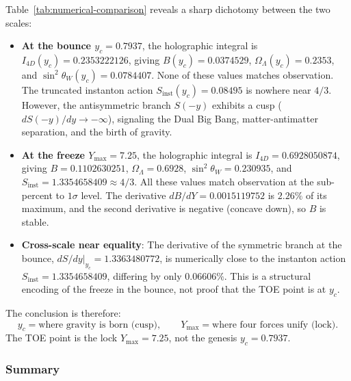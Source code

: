 \documentclass[a4paper,1pt,oneside,openany]{book}
\begin{document}
Table~\ref{tab:numerical-comparison} reveals a sharp dichotomy between the two scales:

\begin{itemize}
\item \textbf{At the bounce $y_c = 0.7937$}, the holographic integral is $I_{4D}(y_c) = 0.2353222126$, giving $B(y_c) = 0.0374529$, $\Omega_\Lambda(y_c) = 0.2353$, and $\sin^2\theta_W(y_c) = 0.0784407$. None of these values matches observation. The truncated instanton action $S_{\mathrm{inst}}(y_c) = 0.08495$ is nowhere near $4/3$. However, the antisymmetric branch $S(-y)$ exhibits a cusp ($dS(-y)/dy \to -\infty$), signaling the Dual Big Bang, matter-antimatter separation, and the birth of gravity.

\item \textbf{At the freeze $Y_{\max} = 7.25$}, the holographic integral is $I_{4D} = 0.6928050874$, giving $B = 0.1102630251$, $\Omega_\Lambda = 0.6928$, $\sin^2\theta_W = 0.230935$, and $S_{\mathrm{inst}} = 1.3354658409 \approx 4/3$. All these values match observation at the sub-percent to $1\sigma$ level. The derivative $dB/dY = 0.0015119752$ is $2.26\%$ of its maximum, and the second derivative is negative (concave down), so $B$ is stable.

\item \textbf{Cross-scale near equality}: The derivative of the symmetric branch at the bounce, $dS/dy|_{y_c} = 1.3363480772$, is numerically close to the instanton action $S_{\mathrm{inst}} = 1.3354658409$, differing by only $0.06606\%$. This is a structural encoding of the freeze in the bounce, not proof that the TOE point is at $y_c$.
\end{itemize}

The conclusion is therefore:
\begin{equation}
\boxed{y_c = \text{where gravity is born (cusp)}, \qquad Y_{\max} = \text{where four forces unify (lock)}.}
\label{eq:genesis-lock-table}
\end{equation}
The TOE point is the lock $Y_{\max} = 7.25$, not the genesis $y_c = 0.7937$.

\subsubsection{Summary}
\end{document}
